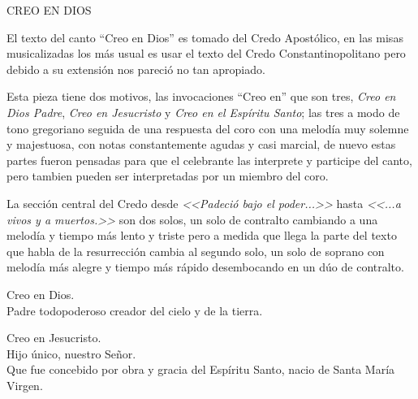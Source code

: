 \documentclass[12pt, letterpaper]{report}
\begin{document}



    \begin{center}
      {\large CREO EN DIOS}
    \end{center}

    El texto del canto ``Creo en Dios'' es tomado del Credo Apost\'olico, en las misas musicalizadas los m\'as usual es usar el texto del Credo Constantinopolitano pero debido a su extensi\'on nos pareci\'o no tan apropiado.

    Esta pieza tiene dos motivos, las invocaciones ``Creo en'' que son tres, \textit{Creo en Dios Padre}, \textit{Creo en Jesucristo} y \textit{Creo en el Esp\'iritu Santo}; las tres a modo de tono gregoriano seguida de una respuesta del coro con una melod\'ia muy solemne y majestuosa, con notas constantemente agudas y casi marcial, de nuevo estas partes fueron pensadas para que el celebrante las interprete y participe del canto, pero tambien pueden ser interpretadas por un miembro del coro.

    La secci\'on central del Credo desde \textit{<<Padeci\'o bajo el poder...>>} hasta \textit{<<...a vivos y a muertos.>>} son dos solos, un solo de contralto cambiando a una melod\'ia y tiempo m\'as lento y triste pero a medida que llega la parte del texto que habla de la resurrecci\'on cambia al segundo solo, un solo de soprano con melod\'ia m\'as alegre y tiempo m\'as r\'apido desembocando en un d\'uo de contralto.

    \noindent
    Creo en Dios.\\
    Padre todopoderoso creador del cielo y de la tierra.

    \noindent
    Creo en Jesucristo.\\
    Hijo \'unico, nuestro Se\~nor.\\
    Que fue concebido por obra y gracia del Esp\'iritu Santo, nacio de Santa Mar\'ia Virgen.
\end{document}
